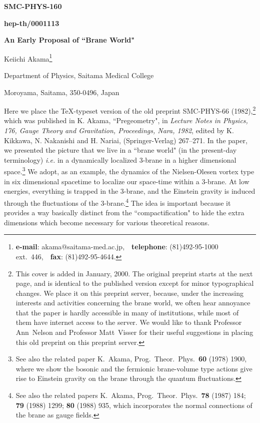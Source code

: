 \documentclass[a4paper,12pt]{article}
\begin{document}

\hfill {\bf SMC-PHYS-160}

\hfill {\bf hep-th/0001113}
\vskip 15mm
\centerline{\Large\bf An Early Proposal of ``Brane World"}
\vskip 20pt
\centerline{Keiichi Akama\footnote{
{\bf e-mail}: akama@saitama-med.ac.jp,\ \ 
{\bf telephone}: (81)492-95-1000 ext.\ 446,\ \ 
{\bf fax}: (81)492-95-4644.
}}
\centerline{Department of Physics, Saitama Medical College}
\centerline{Moroyama, Saitama, 350-0496, Japan}
\vskip 30pt



Here we place the \TeX-typeset version of the old preprint 
	SMC-PHYS-66 (1982),\footnote{
This cover is added in January, 2000.
The original preprint starts at the next page, and is identical to the 
	\vskip0pt\noindent\leftskip18pt
	published version except for minor typographical changes.
We place it on this preprint server, because,
	under the increasing interests and activities 
	concerning the brane world, 
	we often hear annoyance that the paper is hardly accessible in many of institutions,
	while most of them have internet access to the server.
We would like to thank Professor Ann~Nelson and Professor Matt~Visser
	for their useful suggestions in placing this old preprint on this preprint server.
}  
	which was published in
\vskip2mm\noindent
K. Akama, ``Pregeometry", in {\it Lecture Notes in Physics, 176, Gauge Theory and Gravitation, 
	Proceedings, %
	Nara, 1982}, 
	edited by K. Kikkawa, N. Nakanishi and H. Nariai, 
	(Springer-Verlag) 267--271.
\vskip2mm\leftskip10mm\rightskip10mm\noindent
In the paper, we presented the picture
	that we live in a ``brane world" (in the present-day terminology) {\it i.e.}
	in a dynamically localized 3-brane in a higher dimensional space.\footnote{
See also the related paper K.~Akama, Prog.\ Theor.\ Phys.\ {\bf 60} (1978) 1900, 
	where we show the bosonic and 
	\vskip0pt\noindent\leftskip18pt the fermionic brane-volume type actions 
	give rise to Einstein gravity on the brane through the quantum fluctuations.
}
We adopt, as an example, the dynamics of the Nielsen-Olesen vortex type 
	in six dimensional spacetime to localize our space-time within a 3-brane. 
At low energies, everything is trapped in the 3-brane, 
	and the Einstein gravity is induced through the fluctuations of the 3-brane.\footnote{
See also the related papers K.~Akama, Prog.\ Theor.\ Phys.\  
	{\bf 78} (1987) 184; {\bf 79} (1988) 1299; {\bf 80} (1988) 935, 
	\vskip0pt\noindent\leftskip18pt 
	which incorporates the normal connections of the brane as gauge fields.
} 
The idea is important because it provides a way basically distinct 
	from the ``compactification" to hide the extra dimensions
	which become necessary for various theoretical reasons.  
\end{document}

